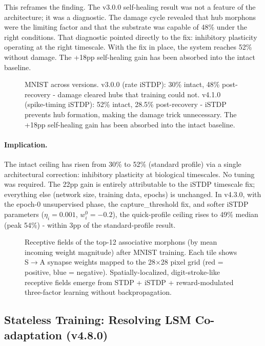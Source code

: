 This reframes the finding. The v3.0.0 self-healing result was not a feature of the architecture; it was a diagnostic. The damage cycle revealed that hub morphons were the limiting factor and that the substrate was capable of 48\% under the right conditions. That diagnostic pointed directly to the fix: inhibitory plasticity operating at the right timescale. With the fix in place, the system reaches 52\% without damage. The +18pp self-healing gain has been absorbed into the intact baseline.

\begin{figure}[h]
  \centering
  \caption{MNIST across versions. v3.0.0 (rate iSTDP): 30\% intact, 48\% post-recovery - damage cleared hubs that training could not. v4.1.0 (spike-timing iSTDP): 52\% intact, 28.5\% post-recovery - iSTDP prevents hub formation, making the damage trick unnecessary. The +18pp self-healing gain has been absorbed into the intact baseline.}
  \label{fig:self_healing}
\end{figure}

\paragraph{Implication.}
The intact ceiling has risen from 30\% to 52\% (standard profile) via a single architectural correction: inhibitory plasticity at biological timescales. No tuning was required. The 22pp gain is entirely attributable to the iSTDP timescale fix; everything else (network size, training data, epochs) is unchanged. In v4.3.0, with the epoch-0 unsupervised phase, the capture\_threshold fix, and softer iSTDP parameters ($\eta_i = 0.001$, $w_i^0 = -0.2$), the quick-profile ceiling rises to 49\% median (peak 54\%) - within 3pp of the standard-profile result.

\begin{figure}[h]
  \centering
  \caption{Receptive fields of the top-12 associative morphons (by mean incoming weight magnitude) after MNIST training. Each tile shows S$\to$A synapse weights mapped to the 28$\times$28 pixel grid (red = positive, blue = negative). Spatially-localized, digit-stroke-like receptive fields emerge from STDP + iSTDP + reward-modulated three-factor learning without backpropagation.}
  \label{fig:receptive_fields}
\end{figure}

\subsection{Stateless Training: Resolving LSM Co-adaptation (v4.8.0)}
\label{sec:stateless_training}

